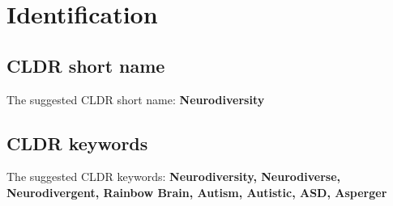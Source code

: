 \section{Identification}

\subsection{CLDR short name}
The suggested CLDR short name: \textbf{Neurodiversity}

\subsection{CLDR keywords}
The suggested CLDR keywords: \textbf{Neurodiversity, Neurodiverse, Neurodivergent, Rainbow Brain, Autism, Autistic, ASD, Asperger}

